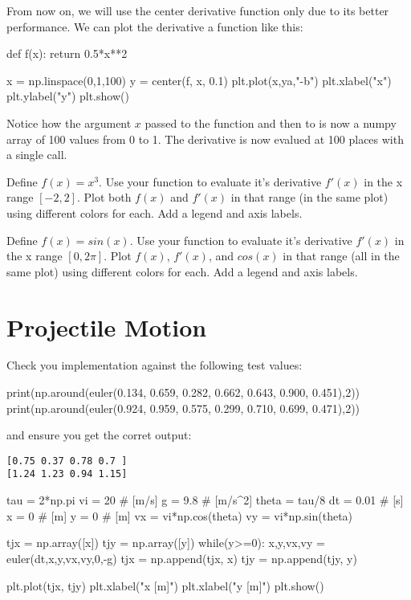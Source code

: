 From now on, we will use the center derivative function only due to
its better performance.  We can plot the derivative a function like
this:
\begin{python}
def f(x):
    return 0.5*x**2

x = np.linspace(0,1,100)
y = center(f, x, 0.1)
plt.plot(x,ya,"-b")
plt.xlabel("x")
plt.ylabel("y")
plt.show()
\end{python}
Notice how the argument $x$ passed to the function 
and then to  is now a numpy array of 100 values from 0 to
1.  The derivative is now evalued at 100 places with a single call.

\plot Define $f(x) = x^3$.  Use your  function to evaluate it's derivative $f'(x)$ in the x range $[-2,2]$.  Plot both $f(x)$ and $f'(x)$ in that range (in the same plot) using different colors for each.  Add a legend and axis labels.


\plot Define $f(x) = sin(x)$.  Use your  function to evaluate it's derivative $f'(x)$ in the x range $[0,2\pi]$.  Plot $f(x)$, $f'(x)$, and $cos(x)$ in that range (all in the same plot) using different colors for each.  Add a legend and axis labels.

\section{Projectile Motion}

\plot Check you implementation against the following test values:
\begin{python}
print(np.around(euler(0.134, 0.659, 0.282, 0.662, 0.643, 0.900, 0.451),2))
print(np.around(euler(0.924, 0.959, 0.575, 0.299, 0.710, 0.699, 0.471),2))
\end{python}
and ensure you get the corret output:
\begin{verbatim}
[0.75 0.37 0.78 0.7 ]
[1.24 1.23 0.94 1.15]
\end{verbatim}

\begin{python}
tau = 2*np.pi
vi    = 20   # [m/s]
g     = 9.8  # [m/s^2]
theta = tau/8
dt = 0.01 # [s] 
x  = 0    # [m]
y  = 0    # [m]
vx = vi*np.cos(theta)
vy = vi*np.sin(theta)
\end{python}

\begin{python}
tjx = np.array([x])
tjy = np.array([y])
while(y>=0):
    x,y,vx,vy = euler(dt,x,y,vx,vy,0,-g)
    tjx = np.append(tjx,  x)
    tjy = np.append(tjy,  y)
    
plt.plot(tjx, tjy)
plt.xlabel("x [m]")
plt.xlabel("y [m]")
plt.show()
\end{python}

